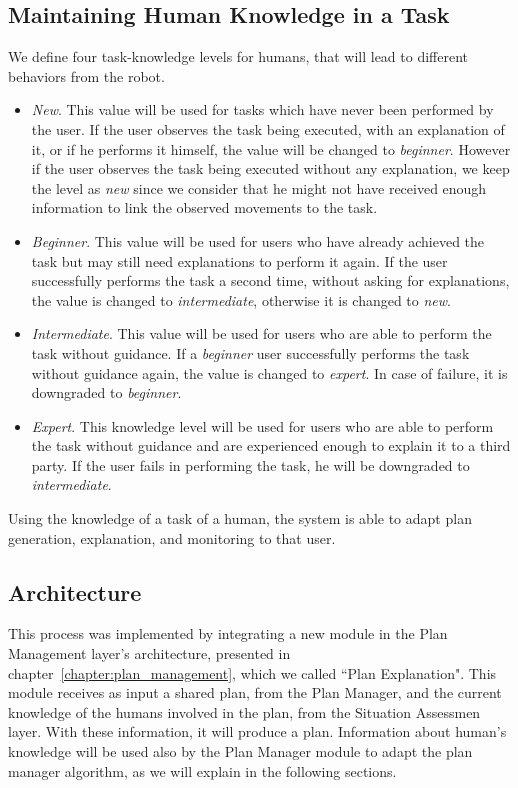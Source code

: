 \subsection{Maintaining Human Knowledge in a Task}
We define four task-knowledge levels for humans, that will lead to different behaviors from the robot.

\begin{itemize}
\item \textit{New}. This value will be used for tasks which have never been performed by the user. If the user observes the task being executed, with an explanation of it, or if he performs it himself, the value will be changed to \textit{beginner}. However if the user observes the task being executed without any explanation, we keep the level as \textit{new} since we consider that he might not have received enough information to link the observed movements to the task.
\item \textit{Beginner}. This value will be used for users who have already achieved the task but may still need explanations to perform it again. If the user successfully performs the task a second time, without asking for explanations, the value is changed to \textit{intermediate}, otherwise it is changed to \textit{new}.
\item \textit{Intermediate}. This value will be used for users who are able to perform the task without guidance. If a \textit{beginner} user successfully performs the task without guidance again, the value is changed to \textit{expert}. In case of failure, it is downgraded to \textit{beginner}.
\item \textit{Expert}. This knowledge level will be used for users who are able to perform the task without guidance and are experienced enough to explain it to a third party. If the user fails in performing the task, he will be downgraded to \textit{intermediate}.
\end{itemize}

Using the knowledge of a task of a human, the system is able to adapt plan generation, explanation, and monitoring to that user.


\subsection{Architecture}
This process was implemented by integrating a new module in the Plan Management layer's architecture, presented in chapter~\ref{chapter:plan_management}, which we called ``Plan Explanation". This module receives as input a shared plan, from the Plan Manager, and the current knowledge of the humans involved in the plan, from the Situation Assessmen layer. With these information, it will produce a plan. Information about human's knowledge will be used also by the Plan Manager module to adapt the plan manager algorithm, as we will explain in the following sections.


